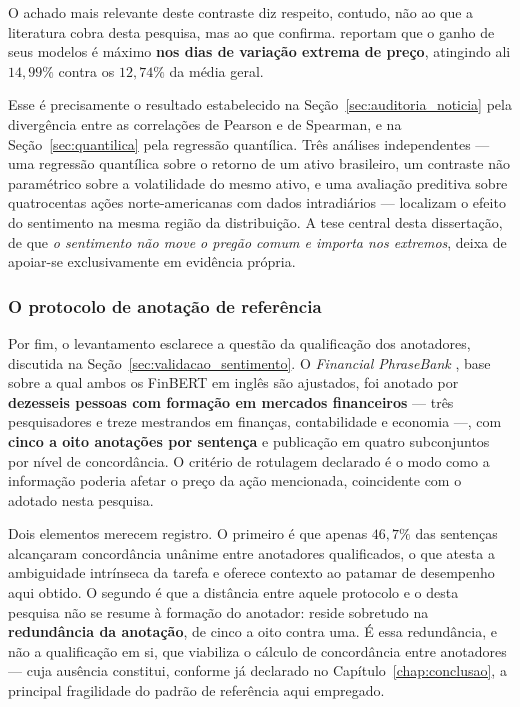 O achado mais relevante deste contraste diz respeito, contudo, não ao que a literatura cobra desta
pesquisa, mas ao que confirma.  reportam que o ganho de
seus modelos é máximo \textbf{nos dias de variação extrema de preço}, atingindo ali $14{,}99\%$
contra os $12{,}74\%$ da média geral.

Esse é precisamente o resultado estabelecido na Seção~\ref{sec:auditoria_noticia} pela divergência
entre as correlações de Pearson e de Spearman, e na Seção~\ref{sec:quantilica} pela regressão
quantílica. Três análises independentes --- uma regressão quantílica sobre o retorno de um ativo
brasileiro, um contraste não paramétrico sobre a volatilidade do mesmo ativo, e uma avaliação
preditiva sobre quatrocentas ações norte-americanas com dados intradiários --- localizam o efeito do
sentimento na mesma região da distribuição. A tese central desta dissertação, de que \emph{o
sentimento não move o pregão comum e importa nos extremos}, deixa de apoiar-se exclusivamente em
evidência própria.

\subsubsection{O protocolo de anotação de referência}

Por fim, o levantamento esclarece a questão da qualificação dos anotadores, discutida na
Seção~\ref{sec:validacao_sentimento}. O \textit{Financial PhraseBank} \cite{malo_good_2014}, base
sobre a qual ambos os FinBERT em inglês são ajustados, foi anotado por \textbf{dezesseis pessoas com
formação em mercados financeiros} --- três pesquisadores e treze mestrandos em finanças,
contabilidade e economia ---, com \textbf{cinco a oito anotações por sentença} e publicação em
quatro subconjuntos por nível de concordância. O critério de rotulagem declarado é o modo como a
informação poderia afetar o preço da ação mencionada, coincidente com o adotado nesta pesquisa.

Dois elementos merecem registro. O primeiro é que apenas $46{,}7\%$ das sentenças alcançaram
concordância unânime entre anotadores qualificados, o que atesta a ambiguidade intrínseca da tarefa
e oferece contexto ao patamar de desempenho aqui obtido. O segundo é que a distância entre aquele
protocolo e o desta pesquisa não se resume à formação do anotador: reside sobretudo na
\textbf{redundância da anotação}, de cinco a oito contra uma. É essa redundância, e não a
qualificação em si, que viabiliza o cálculo de concordância entre anotadores --- cuja ausência
constitui, conforme já declarado no Capítulo~\ref{chap:conclusao}, a principal fragilidade do
padrão de referência aqui empregado.
